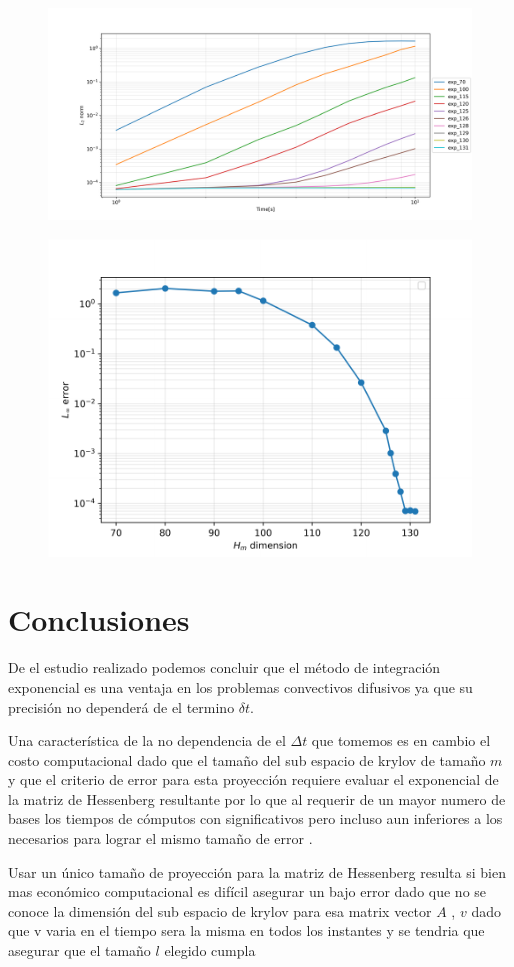 \documentclass[11pt, spanish]{article}
\begin{document}
\begin{figure}[H]
	\centering
	\includegraphics[width=0.7\linewidth]{res/no_homogeneo/L2norm_H_dim_dt_1.0.pdf}
	\caption{}
	\label{fig:Hdim}
\end{figure}

\begin{figure}[H]
	\centering
	\includegraphics[width=0.7\linewidth]{res/no_homogeneo/H_dim.pdf}
	\caption{}
	\label{fig:dim h}
\end{figure}



\section{Conclusiones}
De el estudio realizado podemos concluir que el m\'etodo de integraci\'on exponencial es una ventaja en los problemas convectivos difusivos ya que su precisi\'on no depender\'a de el termino $\delta t$.

Una caracter\'istica de la no dependencia de el $\Delta t$ que tomemos es en cambio el costo computacional dado que el tamaño del sub espacio de krylov de tamaño $m$ y que el criterio de error para esta proyecci\'on requiere evaluar el exponencial de la matriz de Hessenberg resultante por lo que al requerir de un mayor numero de bases los tiempos de c\'omputos con significativos pero incluso aun inferiores a los necesarios para lograr el mismo tamaño de error . 

Usar un \'unico tamaño de proyecci\'on para la matriz de Hessenberg resulta si bien mas econ\'omico computacional es dif\'icil asegurar un bajo error dado que no se conoce la dimensi\'on del sub espacio de krylov para esa matrix vector $A$ , $v$ dado que v varia en el tiempo sera la misma en todos los instantes y se tendria que asegurar que el tamaño $ l $ elegido cumpla 


\printbibliography
\end{document}
